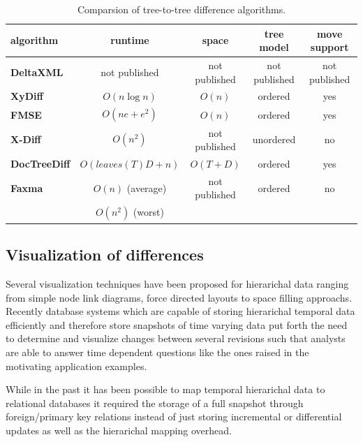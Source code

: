 \begin{table}[tb]
\centering 
\begin{tabular}[r]{|l|c|c|c|c|} 
\hline
\textbf{algorithm} & \textbf{runtime} & \textbf{space} & \textbf{tree model} & \textbf{move support}\\
\hline
\hline
\textbf{DeltaXML} & not published & not published & not published & not published\\
\hline
\textbf{XyDiff} & $O(n \log n)$ & $O(n)$ & ordered & yes\\
\hline
\textbf{FMSE} & $O(n e + e^2)$ & $O(n)$ & ordered & yes\\
\hline
\textbf{X-Diff} & $O(n^2)$ & not published & unordered & no\\
\hline
\textbf{DocTreeDiff} & $O(leaves(T)D + n)$ & $O(T+D)$ & ordered & yes\\
\hline
\textbf{Faxma} & $O(n)$ (average) & not published & ordered & no\\
& $O(n^2)$ (worst) &  & & \\
\hline
\end{tabular}
\label{chap2:comparsion}
\vspace{0.5em} 
\caption{Comparsion of tree-to-tree difference algorithms.}
\end{table}

\subsection{Visualization of differences}
Several visualization techniques have been proposed for hierarichal data ranging from simple node link diagrams, force directed layouts to space filling approachs. Recently database systems which are capable of storing hierarichal temporal data efficiently and therefore store snapshots of time varying data put forth the need to determine and visualize changes between several revisions such that analysts are able to answer time dependent questions like the ones raised in the motivating application examples.

While in the past it has been possible to map temporal hierarichal data to relational databases it required the storage of a full snapshot through foreign/primary key relations instead of just storing incremental or differential updates as well as the hierarichal mapping overhead.

